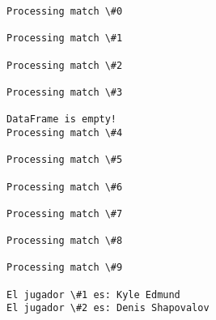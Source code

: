\documentclass[11pt]{article}
\begin{document}
    \begin{Verbatim}[commandchars=\\\{\}]
Processing match \#0

Processing match \#1

Processing match \#2

Processing match \#3

DataFrame is empty!
Processing match \#4

Processing match \#5

Processing match \#6

Processing match \#7

Processing match \#8

Processing match \#9

El jugador \#1 es: Kyle Edmund
El jugador \#2 es: Denis Shapovalov

    \end{Verbatim}

    
    
\end{document}
